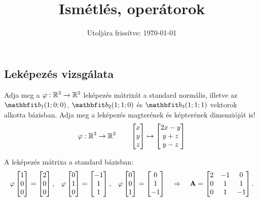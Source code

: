 \documentclass{szb-solution}
\title{Ismétlés, operátorok}
\date{Utoljára frissítve: \today}
\begin{document}
\maketitle

\subsection{Leképezés vizsgálata}

Adja meg a $\varphi : \mathbb{R}^3 \to \mathbb{R}^3$ leképezés mátrixát a
standard normális, illetve az $\rvec b_1(1; 0; 0)$, $\rvec b_2(1; 1; 0)$
és $\rvec b_3(1; 1; 1)$ vektorok alkotta bázisban. Adja meg a leképezés
magterének és képterének dimenzióját is!
$$
  \varphi : \mathbb{R}^3 \to \mathbb{R}^3
  \qquad
  \begin{bmatrix}
    x \\ y \\ z
  \end{bmatrix}
  \mapsto
  \begin{bmatrix}
    2x - y \\ y + z \\ y - z
  \end{bmatrix}
$$

A leképezés mátrixa a standard bázisban:
$$
  \varphi \begin{bmatrix}
    1 \\ 0 \\ 0
  \end{bmatrix} = \begin{bmatrix}
    2 \\ 0 \\ 0
  \end{bmatrix}
  \text,\quad
  \varphi \begin{bmatrix}
    0 \\ 1 \\ 0
  \end{bmatrix} = \begin{bmatrix}
    -1 \\ 1 \\ 1
  \end{bmatrix}
  \text,\quad
  \varphi \begin{bmatrix}
    0 \\ 0 \\ 1
  \end{bmatrix} = \begin{bmatrix}
    0 \\ 1 \\ -1
  \end{bmatrix}
  \quad\Rightarrow\quad
  \mathbf{A} = \begin{bmatrix}
    2 & -1 & 0  \\
    0 & 1  & 1  \\
    0 & 1  & -1
  \end{bmatrix}
  \text.
$$
\end{document}
